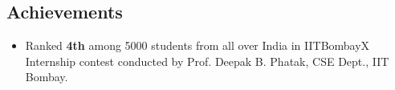 \documentclass[11pt,margin, centered]{res}
\begin{document}
\begin{resume}

\section{Achievements}
\vspace{12mm}
\begin{itemize}[leftmargin=*]
\item Ranked \textbf{4th} among 5000 students from all over India in IITBombayX Internship contest conducted by Prof. Deepak B. Phatak, CSE Dept., IIT Bombay.
\end{itemize}


\end{resume}
\end{document}
